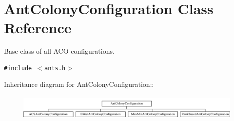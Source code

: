 \hypertarget{classAntColonyConfiguration}{
\section{AntColonyConfiguration Class Reference}
\label{classAntColonyConfiguration}
}
Base class of all ACO configurations.  


{\tt \#include $<$ants.h$>$}

Inheritance diagram for AntColonyConfiguration::\begin{figure}[H]
\begin{center}
\leavevmode
\includegraphics[height=1.2844cm]{classAntColonyConfiguration}
\end{center}
\end{figure}
